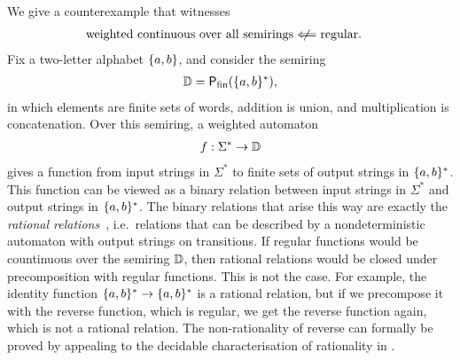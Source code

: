 \begin{myexample} 
    \label{ex:all-semirings}
    We give a counterexample that witnesses
    \begin{align*}
    \text{weighted continuous over all semirings}
    & {\centernot \impliedby} \text{regular}.
    \end{align*}
    Fix a two-letter alphabet $\{a,b\}$, and  consider the semiring 
    \begin{align*}
    \mathbb D = \mathsf{P}_{\mathrm{fin}}(\{a,b\}^*),
    \end{align*}
    in which elements are finite sets of words, addition is union, and multiplication is concatenation. Over this semiring, a weighted automaton 
    \begin{align*}
    f : \Sigma^* \to \mathbb D
    \end{align*}
    gives a function from input strings in $\Sigma^*$ to finite sets of output strings in $\{a,b\}^*$. This function can be viewed as a binary relation between input strings in $\Sigma^*$ and output strings in $\{a,b\}^*$. The binary relations that arise this way are exactly the \emph{rational relations}~\cite[Chapter IX]{Eilenberg74}, i.e.~relations that can be  described by a nondeterministic automaton with output strings on transitions. If regular functions would be countinuous over the semiring $\mathbb D$, then rational relations would be closed under precomposition with regular functions. This is not the case. For example, the identity function $\{a,b\}^* \to \{a,b\}^*$ is a rational relation, but if we precompose it with the reverse function, which is regular, we get the reverse function again, which is not a rational relation. The non-rationality of reverse can formally be proved by appealing to the decidable characterisation of rationality in \cite[Theorem 1]{filiot2013two}.
\end{myexample}


